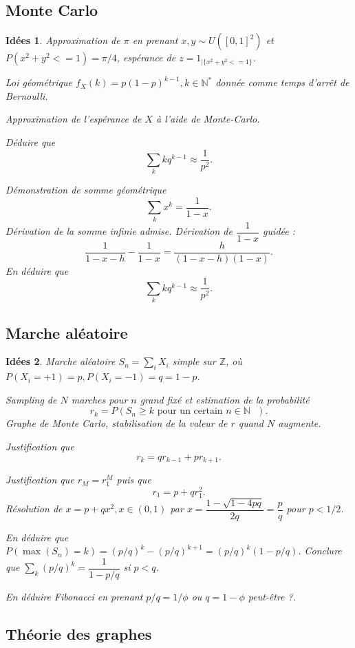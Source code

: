 \documentclass[a4paper,12pt, notitlepage]{article}
\theoremstyle{plain}
\newtheorem{idee}{Idées}
\newcommand{\N}{\mathbb{N}}
\begin{document}
\subsection{Monte Carlo}

\begin{idee}
	Approximation de $\pi$ en prenant $x,y \sim U([0,1]^2)$ et $P(x^2 + y^2 <= 1) = \pi/4$, espérance de $z = 1_{|\{x^2 + y^2 <= 1\}}$.

	Loi géométrique $f_X(k) = p(1-p)^{k-1}, k\in\N^*$ donnée comme temps d'arrêt de Bernoulli.
	
	Approximation de l'espérance de $X$ à l'aide de Monte-Carlo.
	
	Déduire que 
		\[ \sum_k k q^{k-1} \approx \dfrac1{p^2}. \]
		
	Démonstration de somme géométrique
		\[ \sum_k x^k = \dfrac1{1-x}. \]
	Dérivation de la somme infinie admise. Dérivation de $\dfrac1{1-x}$ guidée : 
		\[ \dfrac1{1-x-h} - \dfrac1{1-x} = \dfrac{h}{(1-x-h)(1-x)}. \]
	En déduire que
		\[ \sum_k k q^{k-1} \approx \dfrac1{p^2}. \]
	
\end{idee}


\subsection{Marche aléatoire}

\begin{idee}
	Marche aléatoire $S_n = \sum_i X_i$ simple sur $\mathbb{Z}$, où $P(X_i = +1) = p, P(X_i = -1) = q = 1-p$.
	
	Sampling de $N$ marches pour $n$ grand fixé et estimation de la probabilité
		\[ r_k = P(S_n \geq k \text{ pour un certain $n\in\N$ }). \]
	Graphe de Monte Carlo, stabilisation de la valeur de $r$ quand $N$ augmente.
	
	Justification que 
		\[ r_k = q r_{k-1} + p r_{k+1}. \]
		
	Justification que $r_M = r_1^M$ puis que
		\[ r_1 = p + q r_1^2. \]
	Résolution de $x = p + qx^2, x \in (0,1)$ par $x = \dfrac{1-\sqrt{1-4pq}}{2q} = \dfrac{p}{q}$ pour $p<1/2$.
	
	En déduire que $P(\max(S_n) = k) = (p/q)^k - (p/q)^{k+1} = (p/q)^k (1-p/q)$. 
	Conclure que $\sum_k (p/q)^k = \dfrac{1}{1-p/q}$ si $p<q$.
	
	En déduire Fibonacci en prenant $p/q = 1/\phi$ ou $q = 1-\phi$ peut-être ?.
\end{idee}


\subsection{Théorie des graphes}
\end{document}
